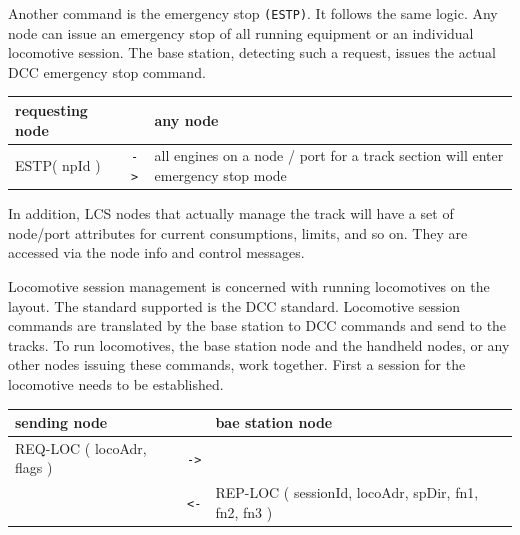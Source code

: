 Another command is the emergency stop \texttt{(ESTP)}. It follows the same logic. Any node can issue an emergency stop of all running equipment or an individual locomotive session. The base station, detecting such a request, issues the actual DCC emergency stop command. 

\begin{table}[ht!]
    \begin{center}
        \begin{tabular}{|p{}| c |p{}|}
            \toprule
            \textbf{requesting node} & & \textbf{ any node} \\
            \midrule
            ESTP( npId ) & \texttt{->} & all engines on a node / port for a track section will enter emergency stop mode  \\
            \bottomrule
        \end{tabular}
    \end{center}
\end{table}

In addition, LCS nodes that actually manage the track will have a set of node/port attributes for current consumptions, limits, and so on. They are accessed via the node info and control messages.


Locomotive session management is concerned with running locomotives on the layout. The standard supported is the DCC standard. Locomotive session commands are translated by the base station to DCC commands and send to the tracks. To run locomotives, the base station node and the handheld nodes, or any other nodes issuing these commands,  work together. First a session for the locomotive needs to be established.

\begin{table}[ht!]
    \begin{center}
        \begin{tabular}{|p{}| c |p{}|}
            \toprule
            \textbf{sending node} & & \textbf{ bae station node} \\
            \midrule
            REQ-LOC ( locoAdr, flags ) & \texttt{->} &  \\
            \midrule
            & \texttt{<-} & REP-LOC ( sessionId, locoAdr, spDir, fn1, fn2, fn3 ) \\
            \bottomrule
        \end{tabular}
    \end{center}
\end{table}

